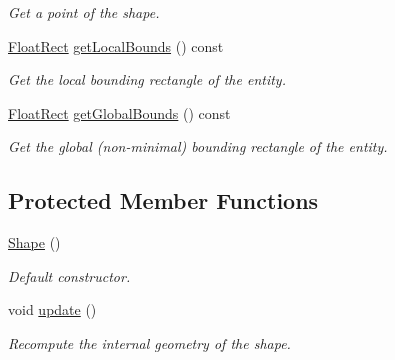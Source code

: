 \begin{DoxyCompactItemize}
\begin{DoxyCompactList}\small\item\em Get a point of the shape. \end{DoxyCompactList}\item 
\mbox{\hyperlink{classsf_1_1_rect}{Float\+Rect}} \mbox{\hyperlink{classsf_1_1_shape_ae3294bcdf8713d33a862242ecf706443}{get\+Local\+Bounds}} () const
\begin{DoxyCompactList}\small\item\em Get the local bounding rectangle of the entity. \end{DoxyCompactList}\item 
\mbox{\hyperlink{classsf_1_1_rect}{Float\+Rect}} \mbox{\hyperlink{classsf_1_1_shape_ac0e29425d908d5442060cc44790fe4da}{get\+Global\+Bounds}} () const
\begin{DoxyCompactList}\small\item\em Get the global (non-\/minimal) bounding rectangle of the entity. \end{DoxyCompactList}\end{DoxyCompactItemize}
\subsection*{Protected Member Functions}
\begin{DoxyCompactItemize}
\item 
\mbox{\hyperlink{classsf_1_1_shape_a413a457f720835b9f5d8e97ca8b80960}{Shape}} ()
\begin{DoxyCompactList}\small\item\em Default constructor. \end{DoxyCompactList}\item 
void \mbox{\hyperlink{classsf_1_1_shape_adfb2bd966c8edbc5d6c92ebc375e4ac1}{update}} ()
\begin{DoxyCompactList}\small\item\em Recompute the internal geometry of the shape. \end{DoxyCompactList}\end{DoxyCompactItemize}
